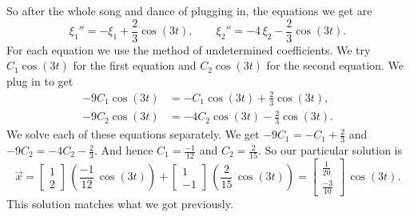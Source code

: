 \documentclass{ximera}
\begin{document}
\begin{exampleSol}
\begin{equation*}
    \end{equation*}
    So after the whole song and dance of plugging in, the equations we get are
    \begin{equation*}
        \xi_1'' = - \xi_1 + \frac{2}{3} \cos (3t) , \qquad \xi_2'' = -4 \, \xi_2 - \frac{2}{3} \cos (3t) .
    \end{equation*}
    For each equation we use the method of undetermined coefficients. We try $C_1 \cos (3t)$ for the first equation and $C_2 \cos (3t)$ for the second equation. We plug in to get
    \begin{align*}
        - 9 C_1 \cos (3t) & = - C_1 \cos (3t) + \frac{2}{3} \cos (3t) , \\
        - 9 C_2 \cos (3t) & = - 4 C_2 \cos (3t) - \frac{2}{3} \cos (3t) .
    \end{align*}
    We solve each of these equations separately.  We get $- 9 C_1 = - C_1 + \frac{2}{3}$ and $- 9 C_2 = - 4C_2 - \frac{2}{3}$.  And hence $C_1 = \frac{-1}{12}$ and $C_2 = \frac{2}{15}$. So our particular solution is
    \begin{equation*}
        \vec{x} =
        \begin{bmatrix} 
            1 \\
            2 
        \end{bmatrix} \,
        \left( \frac{-1}{12} \, \cos (3t) \right) +
        \begin{bmatrix} 
            1 \\
            -1 
        \end{bmatrix} \,
        \left( \frac{2}{15} \, \cos (3t) \right) =
        \begin{bmatrix} 
            \frac{1}{20} \\
            \frac{-3}{10} 
        \end{bmatrix} \,
        \cos (3t) .
    \end{equation*}
    This solution matches what we got previously.%
\end{exampleSol}
\end{document}
